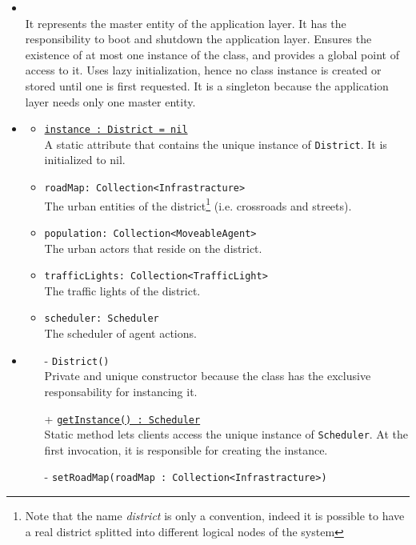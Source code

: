 \begin{itemize}
  \item \textbf{\descr} \\
  It represents the master entity of the application layer. 
  It has the responsibility to boot and shutdown the application layer.
  Ensures the existence of at most one instance of the class, 
  and provides a global point of access to it.
  Uses lazy initialization, hence no class instance is created 
  or stored until one is first requested.
  It is a singleton because the application layer needs 
  only one master entity.
  \item \textbf{\attrs}
  \begin{itemize}
    \item \texttt{\underline{instance : District = nil}} \\
    A static attribute that contains the unique instance of \texttt{District}.
    It is initialized to nil.
    \item \texttt{roadMap: Collection<Infrastracture>} \\
    The urban entities of the district\footnote{Note that the name 
    \textit{district} is only a convention, indeed it is possible to have a 
    real district splitted into different logical nodes of the system}
    (i.e. crossroads and streets). 
    \item \texttt{population: Collection<MoveableAgent>} \\
    The urban actors that reside on the district.
    \item \texttt{trafficLights: Collection<TrafficLight>} \\
    The traffic lights of the district.
    \item \texttt{scheduler: Scheduler} \\
    The scheduler of agent actions.
  \end{itemize}
  \item \textbf{\ops}
  \begin{itemize}
    \item[-] \texttt{District()} \\
    Private and unique constructor because the class has the exclusive 
    responsability for instancing it.
    \item[+] \texttt{\underline{getInstance() : Scheduler}} \\
    Static method lets clients access the unique instance 
    of \texttt{Scheduler}. At the first invocation, it is responsible 
    for creating the instance.
    \item[-] \texttt{setRoadMap(roadMap : Collection<Infrastracture>)}

\end{itemize}
\end{itemize}
